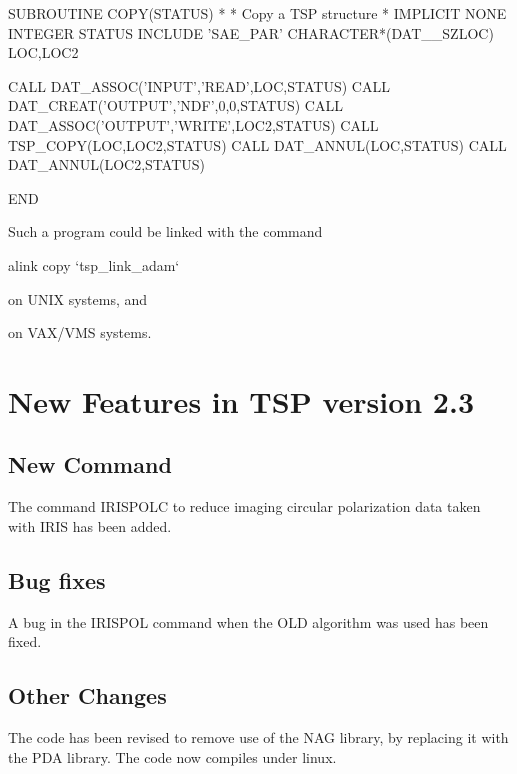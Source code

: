 \documentclass[11pt,twoside,nolof,noabs]{starlink}
\begin{document}
\begin{terminalv}


      SUBROUTINE COPY(STATUS)
*
*  Copy a TSP structure
*
      IMPLICIT NONE
      INTEGER STATUS
      INCLUDE 'SAE_PAR'
      CHARACTER*(DAT__SZLOC) LOC,LOC2


      CALL DAT_ASSOC('INPUT','READ',LOC,STATUS)
      CALL DAT_CREAT('OUTPUT','NDF',0,0,STATUS)
      CALL DAT_ASSOC('OUTPUT','WRITE',LOC2,STATUS)
      CALL TSP_COPY(LOC,LOC2,STATUS)
      CALL DAT_ANNUL(LOC,STATUS)
      CALL DAT_ANNUL(LOC2,STATUS)

      END

\end{terminalv}

Such a program could be linked with the command

\begin{terminalv}

  alink copy `tsp_link_adam`
\end{terminalv}
on UNIX systems, and


on VAX/VMS systems.

\section{New Features in TSP version 2.3}

\subsection{New Command}

The command IRISPOLC to reduce imaging circular polarization data taken with
IRIS has been added.

\subsection{Bug fixes}

A bug in the IRISPOL command when the OLD algorithm was used has been fixed.

\subsection{Other Changes}

The code has been revised to remove use of the NAG library, by replacing it
with the PDA library. The code now compiles under linux.
\end{document}
